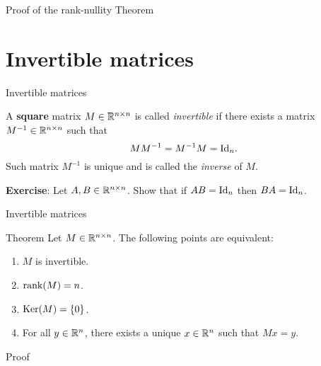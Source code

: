 \documentclass{beamer}
\begin{document}
\begin{frame}[t]{Proof of the rank-nullity Theorem}
	\grid

	\pause
	\pause
	\pause
	\pause
\end{frame}

\section{Invertible matrices}

\begin{frame}[t]{Invertible matrices}
	\grid

	\vspace{-0.3cm}

	\begin{definition}\label{prop:matrix_inverse}
		A \textbf{square} matrix $M \in \mathbb{R}^{n \times n}$ is called \emph{invertible} if there exists a matrix $M^{-1} \in \mathbb{R}^{n \times n}$ such that 
		$$
		M M^{-1} = M^{-1} M = {{\rm Id}}_n.
		$$
		Such matrix $M^{-1}$ is unique and is called the \emph{inverse} of $M$.
	\end{definition}
	\textbf{Exercise}: Let $A,B \in \mathbb{R}^{n \times n}$. Show that if $AB = {{\rm Id}}_n$ then $BA = {{\rm Id}}_n$.

\end{frame}

\begin{frame}[t]{Invertible matrices}
	\grid

	\vspace{-0.3cm}

	\begin{block}{Theorem}
		Let $M \in \mathbb{R}^{n \times n}$. The following points are equivalent:
		\begin{enumerate}
			\item \label{item:th_i} $M$ is invertible.
			\item \label{item:th_ii} ${{\rm rank}}(M) = n$.
			\item \label{item:th_iii} ${{\rm Ker}}(M) = \{0\}$.
			\item For all $y \in \mathbb{R}^n$, there exists a unique $x \in \mathbb{R}^n$ such that $Mx=y$.
		\end{enumerate}
	\end{block}

\end{frame}
\begin{frame}[t]{Proof}
	\grid

	\pause
	\pause
	\pause
\end{frame}
\end{document}

